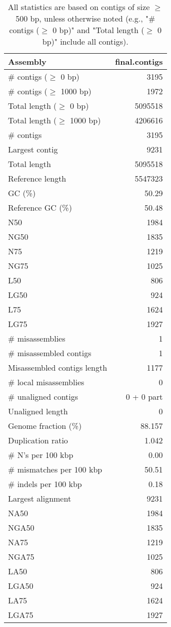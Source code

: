 \documentclass[12pt,a4paper]{article}
\begin{document}
\begin{table}[ht]
\begin{center}
\caption{All statistics are based on contigs of size $\geq$ 500 bp, unless otherwise noted (e.g., "\# contigs ($\geq$ 0 bp)" and "Total length ($\geq$ 0 bp)" include all contigs).}
\begin{tabular}{|l*{1}{|r}|}
\hline
Assembly & final.contigs \\ \hline
\# contigs ($\geq$ 0 bp) & 3195 \\ \hline
\# contigs ($\geq$ 1000 bp) & 1972 \\ \hline
Total length ($\geq$ 0 bp) & 5095518 \\ \hline
Total length ($\geq$ 1000 bp) & 4206616 \\ \hline
\# contigs & 3195 \\ \hline
Largest contig & 9231 \\ \hline
Total length & 5095518 \\ \hline
Reference length & 5547323 \\ \hline
GC (\%) & 50.29 \\ \hline
Reference GC (\%) & 50.48 \\ \hline
N50 & 1984 \\ \hline
NG50 & 1835 \\ \hline
N75 & 1219 \\ \hline
NG75 & 1025 \\ \hline
L50 & 806 \\ \hline
LG50 & 924 \\ \hline
L75 & 1624 \\ \hline
LG75 & 1927 \\ \hline
\# misassemblies & 1 \\ \hline
\# misassembled contigs & 1 \\ \hline
Misassembled contigs length & 1177 \\ \hline
\# local misassemblies & 0 \\ \hline
\# unaligned contigs & 0 + 0 part \\ \hline
Unaligned length & 0 \\ \hline
Genome fraction (\%) & 88.157 \\ \hline
Duplication ratio & 1.042 \\ \hline
\# N's per 100 kbp & 0.00 \\ \hline
\# mismatches per 100 kbp & 50.51 \\ \hline
\# indels per 100 kbp & 0.18 \\ \hline
Largest alignment & 9231 \\ \hline
NA50 & 1984 \\ \hline
NGA50 & 1835 \\ \hline
NA75 & 1219 \\ \hline
NGA75 & 1025 \\ \hline
LA50 & 806 \\ \hline
LGA50 & 924 \\ \hline
LA75 & 1624 \\ \hline
LGA75 & 1927 \\ \hline
\end{tabular}
\end{center}
\end{table}
\end{document}

